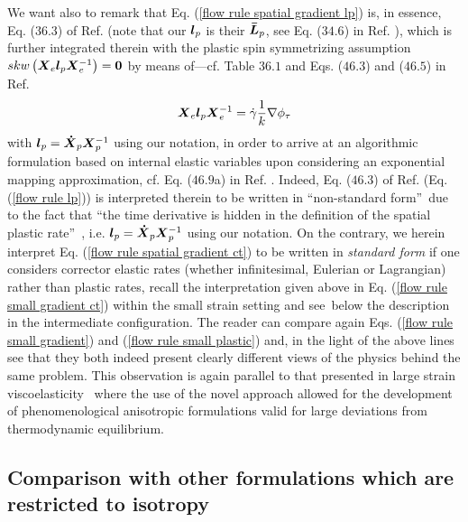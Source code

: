 \documentclass[preprint,review,12pt,sort&compress]{elsarticle}%
\renewcommand{\mathbf}[1]{\mbox{\boldmath $#1$ \unboldmath}  \!\!}
\begin{document}
We want also to remark that Eq. (\ref{flow rule spatial gradient lp}) is, in
essence, Eq. ($36.3$) of Ref. \cite{Simo98} (note that our $\mathbf{l}_{p}$ is
their $\mathbf{\bar{L}}_{p}$, see Eq. ($34.6$) in Ref. \cite{Simo98}), which
is further integrated therein with the plastic spin symmetrizing assumption
$skw\left(  \mathbf{X}_{e}\mathbf{l}_{p}\mathbf{X}_{e}^{-1}\right)
=\mathbf{0}$ by means of---cf. Table $36.1$ and Eqs. ($46.3$) and ($46.5$) in
Ref. \cite{Simo98}%
\begin{equation}
\mathbf{X}_{e}\mathbf{l}_{p}\mathbf{X}_{e}^{-1}=\dot{\gamma}\frac{1}{k}%
\nabla\phi_{\tau} \label{flow rule lp}%
\end{equation}
with $\mathbf{l}_{p}=\mathbf{\dot{X}}_{p}\mathbf{X}_{p}^{-1}$ using our
notation, in order to arrive at an algorithmic formulation based on internal
elastic variables upon considering an exponential mapping approximation, cf.
Eq. ($46.9$a) in Ref. \cite{Simo98}. Indeed, Eq. ($46.3$) of Ref.
\cite{Simo98} (Eq. (\ref{flow rule lp})) is interpreted therein to be written
in \textquotedblleft non-standard form\textquotedblright\ due to the fact that
\textquotedblleft the time derivative is hidden in the definition of the
spatial plastic rate\textquotedblright\ \cite{Simo98}, i.e. $\mathbf{l}%
_{p}=\mathbf{\dot{X}}_{p}\mathbf{X}_{p}^{-1}$ using our notation. On the
contrary, we herein interpret Eq. (\ref{flow rule spatial gradient ct}) to be
written in \emph{standard form} if one considers corrector elastic rates
(whether infinitesimal, Eulerian or Lagrangian) rather than plastic rates,
recall the interpretation given above in Eq.
(\ref{flow rule small gradient ct}) within the small strain setting and
see\ below the description in the intermediate configuration. The reader can
compare again Eqs. (\ref{flow rule small gradient}) and
(\ref{flow rule small plastic}) and, in the light of the above lines see that
they both indeed present clearly different views of the physics behind the
same problem. This observation is again parallel to that presented in large
strain viscoelasticity \cite{LatMonCM2015}\ where the use of the novel
approach allowed for the development of phenomenological anisotropic
formulations valid for large deviations from thermodynamic equilibrium.

\subsection{Comparison with other formulations which are restricted to
isotropy}
\end{document}
